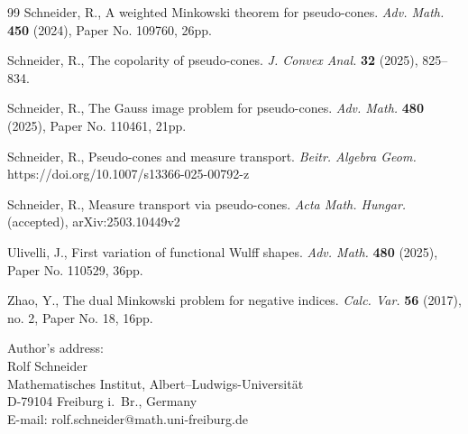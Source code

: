 \documentclass[12pt]{article}
\newcommand{\0}{\mbox{\boldmath$o$}}
\newcommand{\D}{{\rm d}}
\begin{document}
\begin{thebibliography}{99}
 Schneider, R., A weighted Minkowski theorem for pseudo-cones. {\em Adv. Math.} {\bf 450} (2024), Paper No. 109760, 26pp.

 Schneider, R., The copolarity of pseudo-cones. {\em J. Convex Anal.} {\bf 32} (2025), 825--834.

 Schneider, R., The Gauss image problem for pseudo-cones. {\em Adv. Math.} {\bf 480} (2025), Paper No. 110461, 21pp.

 Schneider, R., Pseudo-cones and measure transport. {\em Beitr. Algebra Geom.}\\  https://doi.org/10.1007/s13366-025-00792-z

 Schneider, R., Measure transport via pseudo-cones. {\em Acta Math. Hungar.} (accepted),  arXiv:2503.10449v2

 Ulivelli, J., First variation of functional Wulff shapes. {\em Adv. Math.} {\bf 480} (2025), Paper No. 110529, 36pp. 

 Zhao, Y., The dual Minkowski problem for negative indices. {\em Calc. Var.} {\bf 56} (2017), no. 2, Paper No. 18, 16pp.

\end{thebibliography}

\noindent Author's address:\\[2mm]
Rolf Schneider\\Mathematisches Institut, Albert--Ludwigs-Universit{\"a}t\\D-79104 Freiburg i.~Br., Germany\\E-mail: rolf.schneider@math.uni-freiburg.de
\end{document}
